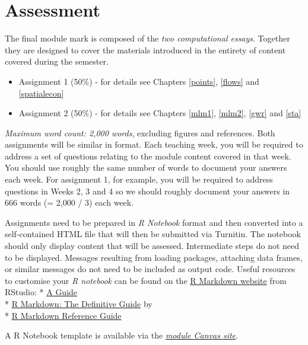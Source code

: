 \documentclass[
]{book}
\providecommand{\tightlist}{%
  \setlength{\itemsep}{0pt}\setlength{\parskip}{0pt}}
\begin{document}
\hypertarget{assessment}{%
\section{Assessment}\label{assessment}}

The final module mark is composed of the \emph{two computational essays}. Together they are designed to cover the materials introduced in the entirety of content covered during the semester.

\begin{itemize}
\tightlist
\item
  Assignment 1 (50\%) - for details see Chapters \ref{points}, \ref{flows} and \ref{spatialecon}
\item
  Assignment 2 (50\%) - for details see Chapters \ref{mlm1}, \ref{mlm2}, \ref{gwr} and \ref{sta}
\end{itemize}

\emph{Maximum word count: 2,000 words}, excluding figures and references. Both assignments will be similar in format. Each teaching week, you will be required to address a set of questions relating to the module content covered in that week. You should use roughly the same number of words to document your answers each week. For assignment 1, for example, you will be required to address questions in Weeks 2, 3 and 4 so we should roughly document your answers in 666 words (= 2,000 / 3) each week.

Assignments need to be prepared in \emph{R Notebook} format and then converted into
a self-contained HTML file that will then be submitted via Turnitin.
The notebook should only display content that will be assessed.
Intermediate steps do not need to be displayed.
Messages resulting from loading packages, attaching data frames, or similar messages do not need to be included as output code.
Useful resources to customise your \emph{R notebook} can be found on the \href{https://rmarkdown.rstudio.com}{R Markdown website} from RStudio:
* \href{https://rmarkdown.rstudio.com/lesson-1.html}{A Guide}\\
* \href{https://bookdown.org/yihui/rmarkdown/}{R Markdown: The Definitive Guide} by \citet{xie2018r}\\
* \href{https://rstudio.com/wp-content/uploads/2015/03/rmarkdown-reference.pdf?_ga=2.199646894.1496049738.1611760832-141828105.1610798362}{R Markdown Reference Guide}

A R Notebook template is available via the \href{https://liverpool.instructure.com}{\emph{module Canvas site}}.
\end{document}
